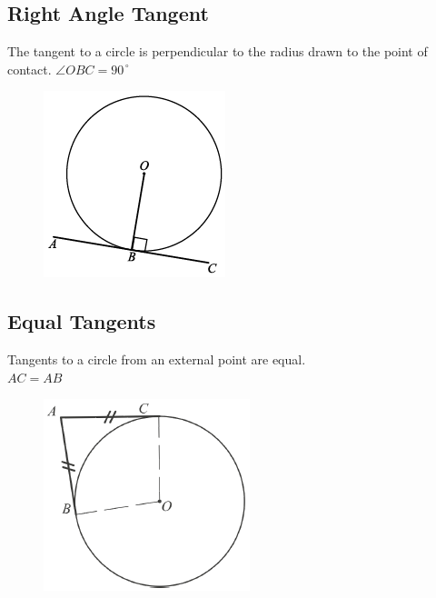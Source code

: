 \documentclass[12pt]{article}
\begin{document}
	\subsection{Right Angle Tangent}
	The tangent to a circle is perpendicular to the radius drawn to the point of contact.
	$\angle OBC = 90^{\,\circ}$
	\begin{figure}[h!]
		\centering
		\includegraphics[height=0.2\textheight]{Graphics/Week_13/RightAngleTangent.png}
	\end{figure}

	\subsection{Equal Tangents}
	Tangents to a circle from an external point are equal.\\
	$AC=AB$
	\begin{figure}[h!]
		\centering
		\includegraphics[height=0.2\textheight]{Graphics/Week_13/EqualTangents.png}
	\end{figure}

\newpage
\newcommand{\spacing}{\\ \\ \\ \\ \\ \\ \\ \\ \\}
\end{document}
